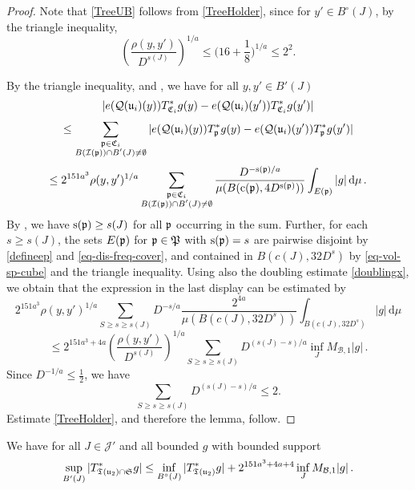     \begin{proof}
        \leanok
        Note that \eqref{TreeUB} follows from \eqref{TreeHolder}, since for $y'\in B^\circ{}(J)$, by the triangle inequality,
        $$\left(\frac{\rho(y,y')}{D^{s(J)}}\right)^{1/a}\le \Big(16 + \frac{1}8\Big)^{1/a}\le 2^2.$$

        By the triangle inequality,  and , we have for all $y, y' \in B'(J)$
        \begin{equation}
            \label{eq-C-Lip}
            |e({\mathcal{Q}}({\mathfrak u}_i)(y)) T_{{\mathfrak C}_i}^* g(y) - e({\mathcal{Q}}({\mathfrak u}_i)(y')) T_{{\mathfrak C}_i}^* g(y')|
        \end{equation}
        $$
            \le \sum_{\substack{{\mathfrak p} \in {\mathfrak C}_i\\ B({\mathcal{I}}({\mathfrak p})) \cap B'(J) \neq \emptyset}} |e({\mathcal{Q}}({\mathfrak u}_i)(y)) T_{{\mathfrak p}}^* g(y) - e({\mathcal{Q}}({\mathfrak u}_i)(y')) T_{{\mathfrak p}}^* g(y')|
        $$
        $$
            \le 2^{151a^3}\rho(y,y')^{1/a} \sum_{\substack{{\mathfrak p} \in {\mathfrak C}_i\\ B({\mathcal{I}}({\mathfrak p})) \cap B'(J) \neq \emptyset}} \frac{D^{- {\mathrm{s}}({\mathfrak p})/a}}{\mu(B({\mathrm{c}}({\mathfrak p}), 4D^{{\mathrm{s}}({\mathfrak p})}))} \int_{E({\mathfrak p})} |g| \, \mathrm{d}\mu\,.
        $$
        By , we have ${\mathrm{s}}({\mathfrak p}) \ge s(J)$ for all ${\mathfrak p}$ occurring in the sum. Further, for each $s \ge s(J)$, the sets $E({\mathfrak p})$ for ${\mathfrak p} \in {\mathfrak P}$ with ${\mathrm{s}}({\mathfrak p}) = s$ are pairwise disjoint by \eqref{defineep} and \eqref{eq-dis-freq-cover}, and contained in $B(c(J), 32D^{s})$ by \eqref{eq-vol-sp-cube} and the triangle inequality. Using also the doubling estimate \eqref{doublingx}, we obtain that the expression in the last display can be estimated by
        $$
            2^{151a^3}\rho(y,y')^{1/a} \sum_{S \ge s \ge s(J)} D^{-s/a} \frac{2^{4a}}{\mu(B(c(J), 32D^{s}))} \int_{B(c(J), 32D^{s})} |g| \, \mathrm{d}\mu
        $$
        $$
            \le 2^{151a^3+4a} \left(\frac{\rho(y,y')}{D^{s(J)}}\right)^{1/a} \sum_{S \ge s \ge s(J)} D^{(s(J) - s)/a} \inf_J M_{\mathcal{B},1} |g|\,.
        $$
        Since $D^{-1/a}\le\frac12$, we have
        $$
            \sum_{S \ge s \ge s(J)} D^{(s(J) - s)/a} \le 2.
        $$
        Estimate \eqref{TreeHolder}, and therefore the lemma, follow.
    \end{proof}

    \begin{lemma}
        \label{global-tree-control-2}
        \leanok
        We have for all $J \in \mathcal{J}'$ and all bounded $g$ with bounded support
        $$
            \sup_{B'(J)} |T^*_{{\mathfrak T}({\mathfrak u}_2) \cap \mathfrak{S}} g| \le \inf_{B^\circ{}(J)} |T^*_{{\mathfrak T}({\mathfrak u}_2)} g| + 2^{151a^3+4a+4} \inf_{J} M_{\mathcal{B},1}|g|\,.
        $$
    \end{lemma}


